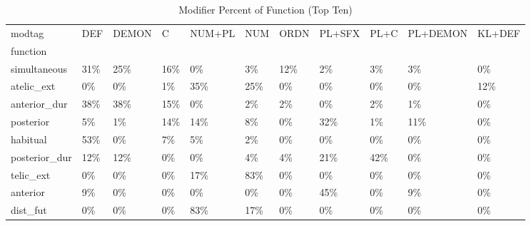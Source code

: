 \begin{table}[htbp!]
\centering
\caption{Modifier Percent of Function (Top Ten)}
\label{table:afmod_pc}
\begin{adjustbox}{width=1\textwidth}
\begin{tabular}{lllllllllll}
\toprule
modtag &  DEF & DEMON &    C & NUM+PL &  NUM & ORDN & PL+SFX & PL+C & PL+DEMON & KL+DEF \\
function      &      &       &      &        &      &      &        &      &          &        \\
\midrule
simultaneous  &  31\% &   25\% &  16\% &     0\% &   3\% &  12\% &     2\% &   3\% &       3\% &     0\% \\
atelic\_ext    &   0\% &    0\% &   1\% &    35\% &  25\% &   0\% &     0\% &   0\% &       0\% &    12\% \\
anterior\_dur  &  38\% &   38\% &  15\% &     0\% &   2\% &   2\% &     0\% &   2\% &       1\% &     0\% \\
posterior     &   5\% &    1\% &  14\% &    14\% &   8\% &   0\% &    32\% &   1\% &      11\% &     0\% \\
habitual      &  53\% &    0\% &   7\% &     5\% &   2\% &   0\% &     0\% &   0\% &       0\% &     0\% \\
posterior\_dur &  12\% &   12\% &   0\% &     0\% &   4\% &   4\% &    21\% &  42\% &       0\% &     0\% \\
telic\_ext     &   0\% &    0\% &   0\% &    17\% &  83\% &   0\% &     0\% &   0\% &       0\% &     0\% \\
anterior      &   9\% &    0\% &   0\% &     0\% &   0\% &   0\% &    45\% &   0\% &       9\% &     0\% \\
dist\_fut      &   0\% &    0\% &   0\% &    83\% &  17\% &   0\% &     0\% &   0\% &       0\% &     0\% \\
\bottomrule
\end{tabular}
\end{adjustbox}
\end{table}
